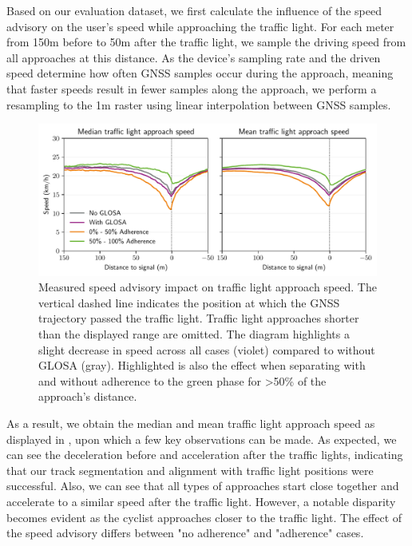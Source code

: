 Based on our evaluation dataset, we first calculate the influence of the speed advisory on the user's speed while approaching the traffic light. For each meter from 150m before to 50m after the traffic light, we sample the driving speed from all approaches at this distance. As the device's sampling rate and the driven speed determine how often GNSS samples occur during the approach, meaning that faster speeds result in fewer samples along the approach, we perform a resampling to the 1m raster using linear interpolation between GNSS samples.

\begin{figure}[t]
\caption{Measured speed advisory impact on traffic light approach speed. The vertical dashed line indicates the position at which the GNSS trajectory passed the traffic light. Traffic light approaches shorter than the displayed range are omitted. The diagram highlights a slight decrease in speed across all cases (violet) compared to without GLOSA (gray). Highlighted is also the effect when separating with and without adherence to the green phase for >50\% of the approach's distance.}\label{fig:impacts-approach-speed}
\includegraphics[width=\linewidth]{images/impacts-approach-speed.pdf}
\end{figure}

As a result, we obtain the median and mean traffic light approach speed as displayed in , upon which a few key observations can be made. As expected, we can see the deceleration before and acceleration after the traffic lights, indicating that our track segmentation and alignment with traffic light positions were successful. Also, we can see that all types of approaches start close together and accelerate to a similar speed after the traffic light. However, a notable disparity becomes evident as the cyclist approaches closer to the traffic light. The effect of the speed advisory differs between "no adherence" and "adherence" cases.

